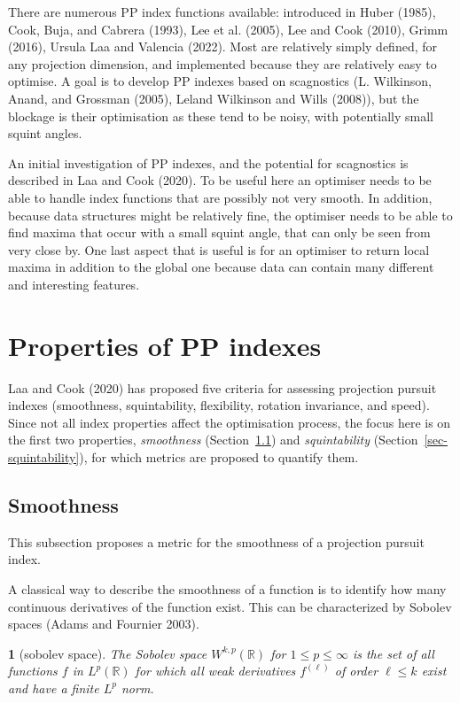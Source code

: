 \documentclass[
  12pt,
]{interact}
\theoremstyle{plain}
\newtheorem{defn}{\protect\definitionname}
\providecommand{\definitionname}{Definition}
\begin{document}
There are numerous PP index functions available: introduced in Huber
(1985), Cook, Buja, and Cabrera (1993), Lee et al. (2005), Lee and Cook
(2010), Grimm (2016), Ursula Laa and Valencia (2022). Most are
relatively simply defined, for any projection dimension, and implemented
because they are relatively easy to optimise. A goal is to develop PP
indexes based on scagnostics (L. Wilkinson, Anand, and Grossman (2005),
Leland Wilkinson and Wills (2008)), but the blockage is their
optimisation as these tend to be noisy, with potentially small squint
angles.

An initial investigation of PP indexes, and the potential for
scagnostics is described in Laa and Cook (2020). To be useful here an
optimiser needs to be able to handle index functions that are possibly
not very smooth. In addition, because data structures might be
relatively fine, the optimiser needs to be able to find maxima that
occur with a small squint angle, that can only be seen from very close
by. One last aspect that is useful is for an optimiser to return local
maxima in addition to the global one because data can contain many
different and interesting features.

\section{Properties of PP indexes}\label{sec-PP-properties}

Laa and Cook (2020) has proposed five criteria for assessing projection
pursuit indexes (smoothness, squintability, flexibility, rotation
invariance, and speed). Since not all index properties affect the
optimisation process, the focus here is on the first two properties,
\emph{smoothness} (Section~\ref{sec-smoothness}) and
\emph{squintability} (Section~\ref{sec-squintability}), for which
metrics are proposed to quantify them.

\subsection{Smoothness}\label{sec-smoothness}

This subsection proposes a metric for the smoothness of a projection
pursuit index.

A classical way to describe the smoothness of a function is to identify
how many continuous derivatives of the function exist. This can be
characterized by Sobolev spaces (Adams and Fournier 2003).

\begin{defn}[sobolev space]\label{def:sobolev_space}
The Sobolev space $W^{k,p}(\mathbb{R})$ for $1\leq p\leq \infty$ is the set of all functions $f$ in $L^p(\mathbb{R})$ for which all weak derivatives $f^{(\ell)}$ of order $\ell\leq k$ exist and have a finite $L^p$ norm.
\end{defn}
\end{document}
